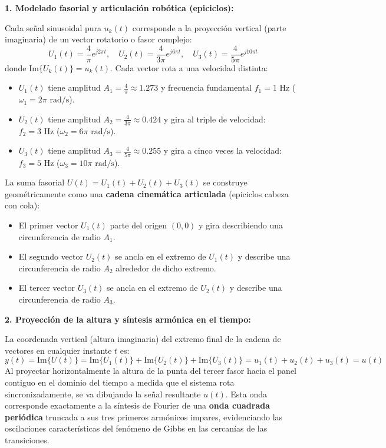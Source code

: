 \documentclass[11pt,a4paper]{article}
\begin{document}
\noindent\textbf{1. Modelado fasorial y articulación robótica (epiciclos):}

Cada señal sinusoidal pura $u_k(t)$ corresponde a la proyección vertical (parte imaginaria) de un vector rotatorio o fasor complejo:
\[
U_1(t) = \frac{4}{\pi} e^{j2\pi t}, \quad U_2(t) = \frac{4}{3\pi} e^{j6\pi t}, \quad U_3(t) = \frac{4}{5\pi} e^{j10\pi t}
\]
donde $\text{Im}\{U_k(t)\} = u_k(t)$. Cada vector rota a una velocidad distinta:
\begin{itemize}
    \item $U_1(t)$ tiene amplitud $A_1 = \frac{4}{\pi} \approx 1.273$ y frecuencia fundamental $f_1 = 1\text{ Hz}$ ($\omega_1 = 2\pi\text{ rad/s}$).
    \item $U_2(t)$ tiene amplitud $A_2 = \frac{4}{3\pi} \approx 0.424$ y gira al triple de velocidad: $f_2 = 3\text{ Hz}$ ($\omega_2 = 6\pi\text{ rad/s}$).
    \item $U_3(t)$ tiene amplitud $A_3 = \frac{4}{5\pi} \approx 0.255$ y gira a cinco veces la velocidad: $f_3 = 5\text{ Hz}$ ($\omega_3 = 10\pi\text{ rad/s}$).
\end{itemize}

La suma fasorial $U(t) = U_1(t) + U_2(t) + U_3(t)$ se construye geométricamente como una \textbf{cadena cinemática articulada} (epiciclos cabeza con cola):
\begin{itemize}
    \item El primer vector $U_1(t)$ parte del origen $(0,0)$ y gira describiendo una circunferencia de radio $A_1$.
    \item El segundo vector $U_2(t)$ se ancla en el extremo de $U_1(t)$ y describe una circunferencia de radio $A_2$ alrededor de dicho extremo.
    \item El tercer vector $U_3(t)$ se ancla en el extremo de $U_2(t)$ y describe una circunferencia de radio $A_3$.
\end{itemize}

\noindent\textbf{2. Proyección de la altura y síntesis armónica en el tiempo:}

La coordenada vertical (altura imaginaria) del extremo final de la cadena de vectores en cualquier instante $t$ es:
\[
y(t) = \text{Im}\{U(t)\} = \text{Im}\{U_1(t)\} + \text{Im}\{U_2(t)\} + \text{Im}\{U_3(t)\} = u_1(t) + u_2(t) + u_3(t) = u(t)
\]
Al proyectar horizontalmente la altura de la punta del tercer fasor hacia el panel contiguo en el dominio del tiempo a medida que el sistema rota sincronizadamente, se va dibujando la señal resultante $u(t)$. Esta onda corresponde exactamente a la síntesis de Fourier de una \textbf{onda cuadrada periódica} truncada a sus tres primeros armónicos impares, evidenciando las oscilaciones características del fenómeno de Gibbs en las cercanías de las transiciones.
\end{document}
